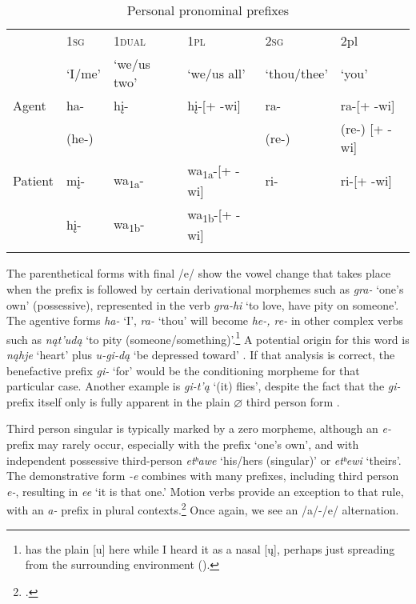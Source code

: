 \documentclass[output=paper]{LSP/langsci}
\begin{document}
\begin{table}
\begin{tabular}{ l l l l l l }
\lsptoprule
& 1\textsc{sg} &  1\textsc{dual} & 1\textsc{pl}  & 2\textsc{sg} &  2{pl}  \\
& `I/me' & `we/us two' & `we/us all' & `thou/thee' & `you' \\
\midrule
Agent & ha-  	& h\k{i}- & h\k{i}-[+ -wi] & ra-  & ra-[+ -wi] \\
& (he-) & & &(re-) & (re-) [+ -wi] \\

Patient & m\k{i}- & wa\textsubscript{1a}-	& wa\textsubscript{1a}-[+ -wi]	&  ri- & ri-[+ -wi] \\
& h\k{i}-	& wa\textsubscript{1b}- & wa\textsubscript{1b}-[+ -wi]	& & \\
\lspbottomrule \end{tabular}

\caption{Personal pronominal prefixes} \label{personalpronominals}
\end{table}

 The parenthetical forms with final /e/ show the vowel change that takes place when the prefix is followed by certain derivational morphemes such as \textit{gra-} `one's own' (possessive), represented in the verb \textit{gra-hi} `to love, have pity on someone'.  The agentive forms \textit{ha-} `I', \textit{ra-} `thou' will become \textit{he-, re-} in other complex verbs such as \textit{n\k{a}t'ud\k{a}} `to pity (someone/something)'.\footnote{\citet{Whitman1947} has the plain [u] here while I heard it as a nasal [\k{u}], perhaps just spreading from the surrounding environment (\citealt{Davidson1997}).}  A potential origin for this word is \textit{n\k{a}hje} `heart' plus \textit{u-gi-d\k{a}} `be depressed toward' \citep[243]{Whitman1947}.  If that analysis is correct, the benefactive prefix \textit{gi-} `for' would be the conditioning morpheme for that particular case.  Another example is \textit{gi-t'\k{a}} `(it) flies', despite the fact that the \textit{gi-} prefix itself only is fully apparent in the plain $\varnothing$ third person form \citep[242]{Whitman1947}.    

Third person singular is typically marked by a zero morpheme, although an \textit{e-} prefix may rarely occur, especially with the  prefix `one's own', and with independent possessive third-person \textit{etʰawe} `his/hers (singular)' or \textit{etʰewi} `theirs'.  The demonstrative form \textit{-e} combines with many prefixes, including third person \textit{e-}, resulting in \textit{ee} `it is that one.'  Motion verbs provide an exception to that rule, with an \textit{a-} prefix in plural contexts.\footnote{\citet{Marsh1936, Taylor1976a}.}   Once again, we see an /a/-/e/ alternation.  
\end{document}
